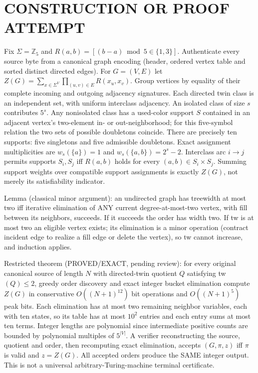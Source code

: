 \documentclass[11pt]{article}
\begin{document}
\section{CONSTRUCTION OR PROOF ATTEMPT}
Fix $\Sigma=\mathbb{Z}_5$ and $R(a,b)=[(b-a)\bmod 5\in\{1,3\}]$. Authenticate every source byte from a canonical graph encoding (header, ordered vertex table and sorted distinct directed edges). For $G=(V,E)$ let $Z(G)=\sum_{x\in\Sigma^V}\prod_{(u,v)\in E}R(x_u,x_v)$.
Group vertices by equality of their complete incoming and outgoing adjacency signatures. Each directed twin class is an independent set, with uniform interclass adjacency. An isolated class of size $s$ contributes $5^s$. Any nonisolated class has a used-color support $S$ contained in an adjacent vertex's two-element in- or out-neighborhood; for this five-symbol relation the two sets of possible doubletons coincide. There are precisely ten supports: five singletons and five admissible doubletons. Exact assignment multiplicities are $w_s(\{a\})=1$ and $w_s(\{a,b\})=2^s-2$. Interclass arc $i\to j$ permits supports $S_i,S_j$ iff $R(a,b)$ holds for every $(a,b)\in S_i\times S_j$. Summing support weights over compatible support assignments is exactly $Z(G)$, not merely its satisfiability indicator.

Lemma (classical minor argument): an undirected graph has treewidth at most two iff iterative elimination of ANY current degree-at-most-two vertex, with fill between its neighbors, succeeds. If it succeeds the order has width two. If tw is at most two an eligible vertex exists; its elimination is a minor operation (contract incident edge to realize a fill edge or delete the vertex), so tw cannot increase, and induction applies.

Restricted theorem (PROVED/EXACT, pending review): for every original canonical source of length $N$ with directed-twin quotient $Q$ satisfying tw$(Q)\le2$, greedy order discovery and exact integer bucket elimination compute $Z(G)$ in conservative $O((N+1)^{12})$ bit operations and $O((N+1)^5)$ peak bits. Each elimination has at most two remaining neighbor variables, each with ten states, so its table has at most $10^2$ entries and each entry sums at most ten terms. Integer lengths are polynomial since intermediate positive counts are bounded by polynomial multiples of $5^{|V|}$. A verifier reconstructing the source, quotient and order, then recomputing exact elimination, accepts $(G,\pi,z)$ iff $\pi$ is valid and $z=Z(G)$. All accepted orders produce the SAME integer output. This is not a universal arbitrary-Turing-machine terminal certificate.
\end{document}

